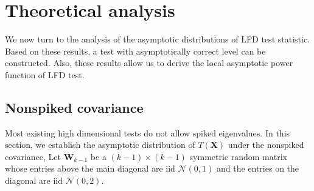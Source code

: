 \documentclass[12pt]{article} %
\newcommand{\bX}{\mathbf{X}}
\newcommand{\bW}{\mathbf{W}}
\theoremstyle{definition}
\begin{document}
\section{Theoretical analysis}
We now turn to the analysis of the asymptotic distributions of LFD test statistic.
Based on these results, a test with asymptotically correct level can be constructed.
Also, these results allow us to derive the local asymptotic power function of LFD test.
\subsection{Nonspiked covariance}
{\color{red} Most existing high dimensional tests do not allow spiked eigenvalues.}
In this section, we establish the asymptotic distribution of $T(\bX)$ under the nonspiked covariance,
Let $\bW_{k-1}$ be a $(k-1)\times(k-1)$ symmetric random matrix whose entries above the main diagonal are iid $\mathcal{N}(0,1)$ and the entries on the diagonal are iid $\mathcal{N}(0,2)$.
\end{document}

